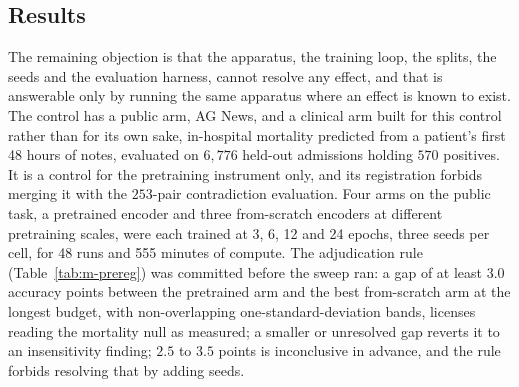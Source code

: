 
\subsection{Results}

The remaining objection is that the apparatus, the training loop, the
splits, the seeds and the evaluation harness, cannot resolve any effect, and that
is answerable only by running the same apparatus where an effect is known to
exist. The control has a public arm, AG News, and a clinical arm built for
this control rather than for its own sake, in-hospital mortality predicted
from a patient's first 48 hours of notes, evaluated on $6{,}776$ held-out
admissions holding $570$ positives. It is a control for the pretraining
instrument only, and its registration forbids merging it with the $253$-pair
contradiction evaluation. Four arms on the public task,
a pretrained encoder and three from-scratch encoders at different
pretraining scales, were each trained at 3, 6, 12 and 24 epochs, three seeds
per cell, for 48 runs and 555 minutes of compute. The adjudication rule
(Table~\ref{tab:m-prereg}) was committed before the sweep ran: a gap of at
least $3.0$ accuracy points between the pretrained arm and the best
from-scratch arm at the longest budget, with non-overlapping
one-standard-deviation bands, licenses reading the mortality null as measured;
a smaller or unresolved gap reverts it to an insensitivity finding; $2.5$ to
$3.5$ points is inconclusive in advance, and the rule forbids resolving that
by adding seeds.

